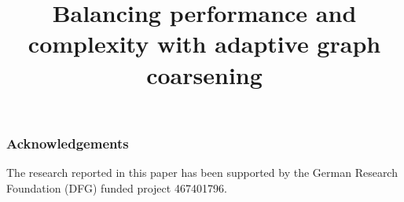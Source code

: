 



\title{Balancing performance and complexity with adaptive graph coarsening}


\author{}

\institute{}

\maketitle











\subsubsection{Acknowledgements}

The research reported in this paper has been supported by the German Research Foundation (DFG) funded project 467401796.






